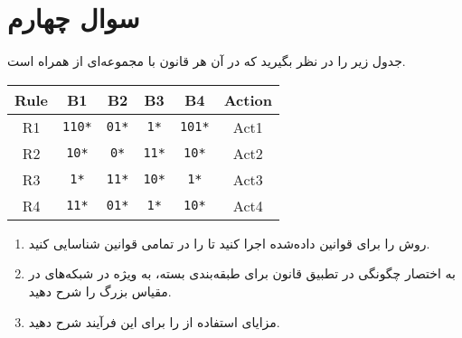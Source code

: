 \section{سوال چهارم}

جدول  زیر را در نظر بگیرید که در آن هر قانون با مجموعه‌ای از  همراه است.

\begin{latin}
	\begin{center}
		\begin{tabular}{|c|c|c|c|c|c|}
			\hline
			\textbf{Rule} & \textbf{B1} & \textbf{B2} & \textbf{B3} & \textbf{B4} & \textbf{Action} \\
			\hline\hline
			R1 & \texttt{110*} & \texttt{01*} & \texttt{1*} & \texttt{101*} & Act1 \\
			\hline\hline
			R2 & \texttt{10*} & \texttt{0*} & \texttt{11*} & \texttt{10*} & Act2 \\
			\hline
			R3 & \texttt{1*} & \texttt{11*} & \texttt{10*} & \texttt{1*} & Act3 \\
			\hline
			R4 & \texttt{11*} & \texttt{01*} & \texttt{1*} & \texttt{10*} & Act4 \\
			\hline
		\end{tabular}
	\end{center}
\end{latin}


\begin{enumerate}
	\item 
	روش  را برای قوانین داده‌شده اجرا کنید تا  را در تمامی قوانین شناسایی کنید.
	
	\item 
	به اختصار چگونگی  در تطبیق قانون برای طبقه‌بندی بسته، به ویژه در شبکه‌های در مقیاس بزرگ را شرح دهید.
	
	\item 
	مزایای استفاده از  را برای این فرآیند شرح دهید.
\end{enumerate}